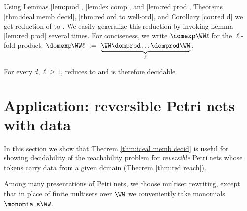 %
\vspace{-1.5mm}
Using Lemmas \ref{lem:prod}, \ref{lem:lex comp}, and \ref{lem:red prod}, 
Theorems \ref{thm:ideal memb decid},
\ref{thm:red ord to well-ord},  
and Corollary \ref{cor:red d} we get reduction
of  to
.
%
%
We easily generalize this reduction by invoking Lemma \ref{lem:red prod} several times.
For conciseness, we write $\domexp \WW \ell$ for the $\ell$-fold product:
$
\domexp \WW \ell \ := \  \underbrace{\WW \domprod \ldots \domprod  \WW}_\ell.
$

\begin{corollary}\label{cor:red times d l}
For every $d,\ell\geq 1$,
 reduces to
and is therefore decidable.
\end{corollary}

%



\section{Application: reversible Petri nets with data} \label{sec:pn}

In this section we show that Theorem \ref{thm:ideal memb decid} is useful for showing
decidability of the reachability problem for \emph{reversible} Petri nets whose tokens carry data
from a given domain
(Theorem \ref{thm:red reach}).

Among many presentations of Petri nets, we choose multiset rewriting, except that in place of
finite multisets over $\WW$ we conveniently take monomials $\monomials \WW$.

